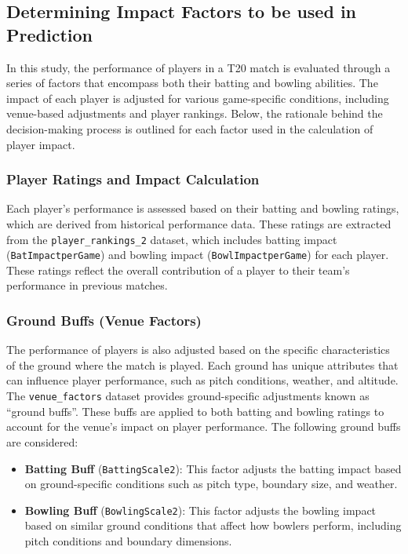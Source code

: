 \documentclass{article}[12pt]
\begin{document}
\subsection{Determining Impact Factors to be used in Prediction}

In this study, the performance of players in a T20 match is evaluated through a series of factors that encompass both their batting and bowling abilities. The impact of each player is adjusted for various game-specific conditions, including venue-based adjustments and player rankings. Below, the rationale behind the decision-making process is outlined for each factor used in the calculation of player impact.

\subsubsection{Player Ratings and Impact Calculation}
Each player’s performance is assessed based on their batting and bowling ratings, which are derived from historical performance data. These ratings are extracted from the \texttt{player\_rankings\_2} dataset, which includes batting impact (\texttt{BatImpactperGame}) and bowling impact (\texttt{BowlImpactperGame}) for each player. These ratings reflect the overall contribution of a player to their team's performance in previous matches.

\subsubsection{Ground Buffs (Venue Factors)}
The performance of players is also adjusted based on the specific characteristics of the ground where the match is played. Each ground has unique attributes that can influence player performance, such as pitch conditions, weather, and altitude. The \texttt{venue\_factors} dataset provides ground-specific adjustments known as ``ground buffs''. These buffs are applied to both batting and bowling ratings to account for the venue’s impact on player performance. The following ground buffs are considered:
\begin{itemize}
    \item \textbf{Batting Buff} (\texttt{BattingScale2}): This factor adjusts the batting impact based on ground-specific conditions such as pitch type, boundary size, and weather.
    \item \textbf{Bowling Buff} (\texttt{BowlingScale2}): This factor adjusts the bowling impact based on similar ground conditions that affect how bowlers perform, including pitch conditions and boundary dimensions.
\end{itemize}
\end{document}
